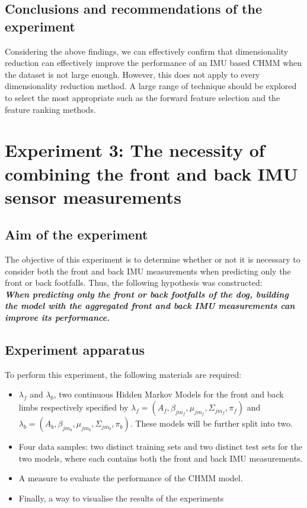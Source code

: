 \subsection{Conclusions and recommendations of the experiment}
Considering the above findings, we can effectively confirm that dimensionality reduction can effectively improve the performance of an IMU based CHMM when the dataset is not large enough. However, this does not apply to every dimensionality reduction method. A large range of technique should be explored to select the most appropriate such as the forward feature selection and the feature ranking methods.


\section{Experiment 3: The necessity of combining the front and back IMU sensor measurements}

\subsection{Aim of the experiment}
The objective of this experiment is to determine whether or not it is necessary to consider both the front and back IMU measurements when predicting only the front or back footfalls. Thus, the following hypothesis was constructed:\\
\textbf{\textit{When predicting only the front or back footfalls of the dog, building the model with the aggregated front and back IMU measurements can improve its performance.}}

\subsection{Experiment apparatus}
To perform this experiment, the following materials are required:
\begin{itemize}
	\item \(\lambda_f\) and \(\lambda_b\), two continuous Hidden Markov Models for the front and back limbs respectively specified by \(\lambda_f = (A_f, \beta_{jm_f}, \mu_{jm_f}, \Sigma_{jm_f}, \pi_f)\) and \(\lambda_b = (A_b, \beta_{jm_b}, \mu_{jm_b}, \Sigma_{jm_b}, \pi_b)\). These models will be further split into two.
	\item Four data samples: two distinct training sets and two distinct test sets for the two models, where each contains both the front and back IMU measurements.
	\item A measure to evaluate the performance of the CHMM model.
	\item Finally, a way to visualise the results of the experiments
\end{itemize}


